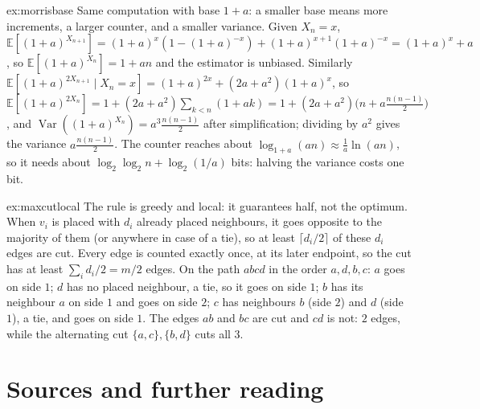 \begin{solution}{ex:morrisbase}
\idea Same computation with base $1+a$: a smaller base means more increments, a larger counter, and a smaller variance.
\writeup Given $X_n=x$, $\mathbb E[(1+a)^{X_{n+1}}]=(1+a)^x(1-(1+a)^{-x})+(1+a)^{x+1}(1+a)^{-x}=(1+a)^x+a$, so $\mathbb E[(1+a)^{X_n}]=1+an$ and the estimator is unbiased. Similarly $\mathbb E[(1+a)^{2X_{n+1}}\mid X_n=x]=(1+a)^{2x}+(2a+a^2)(1+a)^x$, so
$\mathbb E[(1+a)^{2X_n}]=1+(2a+a^2)\sum_{k<n}(1+ak)=1+(2a+a^2)\bigl(n+a\tfrac{n(n-1)}2\bigr)$, and $\operatorname{Var}((1+a)^{X_n})=a^3\frac{n(n-1)}2$ after simplification; dividing by $a^2$ gives the variance $a\frac{n(n-1)}2$. The counter reaches about $\log_{1+a}(an)\approx\frac1a\ln(an)$, so it needs about
$\log_2\log_2n+\log_2(1/a)$ bits: halving the variance costs one bit.
\end{solution}

\begin{solution}{ex:maxcutlocal}
\idea The rule is greedy and local: it guarantees half, not the optimum.
\writeup When $v_i$ is placed with $d_i$ already placed neighbours, it goes opposite to the majority of them (or anywhere in case of a tie), so at least $\lceil d_i/2\rceil$ of these $d_i$ edges are cut. Every edge is counted exactly once, at its later endpoint, so the cut has at least $\sum_id_i/2=m/2$ edges.
On the path $abcd$ in the order $a,d,b,c$: $a$ goes on side $1$; $d$ has no placed neighbour, a tie, so it goes on side $1$; $b$ has its neighbour $a$ on side $1$ and goes on side $2$; $c$ has neighbours $b$ (side $2$) and $d$ (side $1$), a tie, and goes on side $1$. The edges $ab$ and $bc$ are cut and $cd$ is not: $2$ edges, while
the alternating cut $\{a,c\},\{b,d\}$ cuts all $3$.
\end{solution}

\section*{Sources and further reading}

